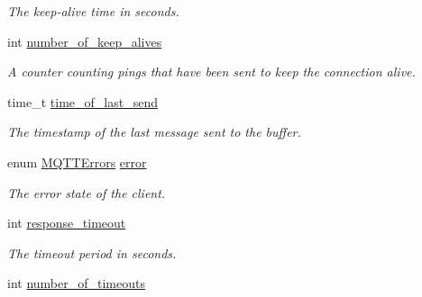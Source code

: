 \begin{DoxyCompactItemize}
\begin{DoxyCompactList}\small\item\em The keep-\/alive time in seconds. \end{DoxyCompactList}\item 
int \hyperlink{structmqtt__client_ac23a02868e9b8c5cd2619b73ee4fcea6}{number\+\_\+of\+\_\+keep\+\_\+alives}
\begin{DoxyCompactList}\small\item\em A counter counting pings that have been sent to keep the connection alive. \end{DoxyCompactList}\item 
time\+\_\+t \hyperlink{structmqtt__client_a48619e2ebe592a9757a3bda1ac97608d}{time\+\_\+of\+\_\+last\+\_\+send}
\begin{DoxyCompactList}\small\item\em The timestamp of the last message sent to the buffer. \end{DoxyCompactList}\item 
enum \hyperlink{group__api_gad0c901a8d30691ed0ca17915b691b7e7}{M\+Q\+T\+T\+Errors} \hyperlink{structmqtt__client_a99e1742736d93361e44c4412e730f113}{error}
\begin{DoxyCompactList}\small\item\em The error state of the client. \end{DoxyCompactList}\item 
int \hyperlink{structmqtt__client_a4ee652148f2b1b338f1527a85879e970}{response\+\_\+timeout}
\begin{DoxyCompactList}\small\item\em The timeout period in seconds. \end{DoxyCompactList}\item 
int \hyperlink{structmqtt__client_af5fed75fb3f83137d5c7635693cd7b6c}{number\+\_\+of\+\_\+timeouts}\hypertarget{structmqtt__client_af5fed75fb3f83137d5c7635693cd7b6c}{}\label{structmqtt__client_af5fed75fb3f83137d5c7635693cd7b6c}


\end{DoxyCompactItemize}
